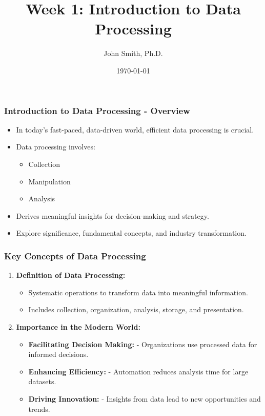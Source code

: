 \documentclass[aspectratio=169]{beamer}
\begin{document}
\frame{\titlepage}

\begin{frame}[fragile]
    \title{Week 1: Introduction to Data Processing}
    \author{John Smith, Ph.D.}
    \date{\today}
    \maketitle
\end{frame}

\begin{frame}[fragile]
    \frametitle{Introduction to Data Processing - Overview}
    \begin{itemize}
        \item In today's fast-paced, data-driven world, efficient data processing is crucial.
        \item Data processing involves:
        \begin{itemize}
            \item Collection
            \item Manipulation
            \item Analysis
        \end{itemize}
        \item Derives meaningful insights for decision-making and strategy.
        \item Explore significance, fundamental concepts, and industry transformation.
    \end{itemize}
\end{frame}

\begin{frame}[fragile]
    \frametitle{Key Concepts of Data Processing}
    \begin{enumerate}
        \item \textbf{Definition of Data Processing:}
        \begin{itemize}
            \item Systematic operations to transform data into meaningful information.
            \item Includes collection, organization, analysis, storage, and presentation.
        \end{itemize}
        
        \item \textbf{Importance in the Modern World:}
        \begin{itemize}
            \item \textbf{Facilitating Decision Making:} 
                - Organizations use processed data for informed decisions.
            \item \textbf{Enhancing Efficiency:} 
                - Automation reduces analysis time for large datasets. 
            \item \textbf{Driving Innovation:} 
                - Insights from data lead to new opportunities and trends.
        \end{itemize}
    \end{enumerate}
\end{frame}
\end{document}
